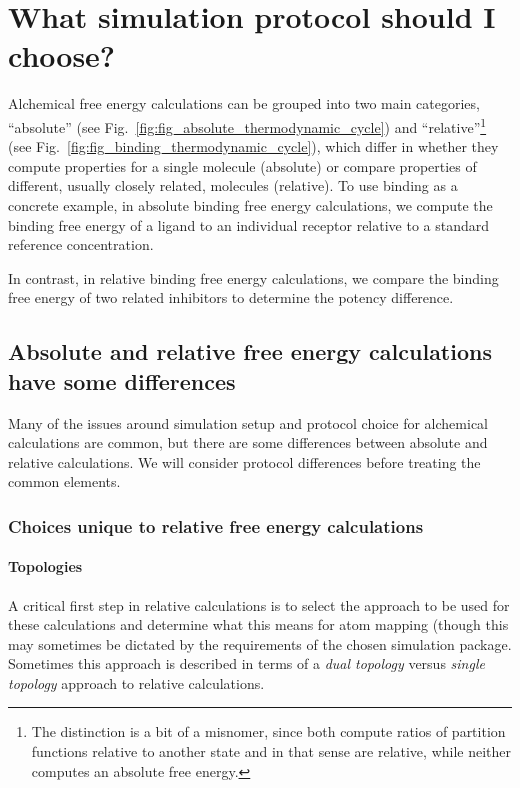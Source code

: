 \documentclass[9pt,bestpractices]{livecoms}
\begin{document}
\section{What simulation protocol should I choose?}
\label{sec:simulation_protocol_choice}
Alchemical free energy calculations can be grouped into two main categories, ``absolute'' (see Fig.~\ref{fig:fig_absolute_thermodynamic_cycle}) and ``relative''\footnote{The distinction is a bit of a misnomer, since both compute ratios of partition functions relative to another state and in that sense are relative, while neither computes an absolute free energy.} (see Fig.~\ref{fig:fig_binding_thermodynamic_cycle}), which differ in whether they compute properties for a single molecule (absolute) or compare properties of different, usually closely related, molecules (relative).
To use binding as a concrete example, in absolute binding free energy calculations, we compute the binding free energy of a ligand to an individual receptor relative to a standard reference concentration.

In contrast, in relative binding free energy calculations, we compare the binding free energy of two related inhibitors to determine the potency difference.

\subsection{Absolute and relative free energy calculations have some differences}
Many of the issues around simulation setup and protocol choice for alchemical calculations are common, but there are some differences between absolute and relative calculations. We will consider protocol differences before treating the common elements.

\subsubsection{Choices unique to relative free energy calculations}
\label{sec:relative-fe-protocol}

\paragraph{Topologies} 
A critical first step in relative calculations is to select the approach to be used for these calculations and determine what this means for atom mapping (though this may sometimes be dictated by the requirements of the chosen simulation package. Sometimes this approach is described in terms of a \emph{dual topology} versus \emph{single topology} approach to relative calculations.
\end{document}

